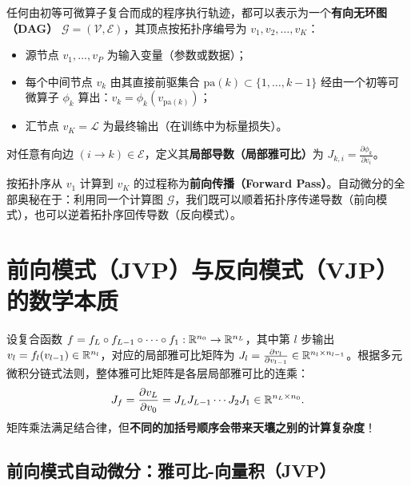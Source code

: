 \begin{defBox}
\begin{definition}
任何由初等可微算子复合而成的程序执行轨迹，都可以表示为一个\textbf{有向无环图（DAG）} $\mathcal{G} = (\mathcal{V}, \mathcal{E})$，其顶点按拓扑序编号为 $v_1, v_2, \dots, v_K$：
\begin{itemize}
  \item 源节点 $v_1, \dots, v_P$ 为输入变量（参数或数据）；
  \item 每个中间节点 $v_k$ 由其直接前驱集合 $\mathrm{pa}(k) \subset \{1, \dots, k-1\}$ 经由一个初等可微算子 $\phi_k$ 算出：$v_k = \phi_k(v_{\mathrm{pa}(k)})$；
  \item 汇节点 $v_K = \mathcal{L}$ 为最终输出（在训练中为标量损失）。
\end{itemize}
对任意有向边 $(i \to k) \in \mathcal{E}$，定义其\textbf{局部导数（局部雅可比）}为 $J_{k,i} = \frac{\partial \phi_k}{\partial v_i}$。
\end{definition}
\end{defBox}

按拓扑序从 $v_1$ 计算到 $v_K$ 的过程称为\textbf{前向传播（Forward Pass）}。自动微分的全部奥秘在于：利用同一个计算图 $\mathcal{G}$，我们既可以顺着拓扑序传递导数（前向模式），也可以逆着拓扑序回传导数（反向模式）。

\section{前向模式（JVP）与反向模式（VJP）的数学本质}
\label{sec:jvp-vjp}

设复合函数 $f = f_L \circ f_{L-1} \circ \cdots \circ f_1 : \mathbb{R}^{n_0} \to \mathbb{R}^{n_L}$，其中第 $l$ 步输出 $v_l = f_l(v_{l-1}) \in \mathbb{R}^{n_l}$，对应的局部雅可比矩阵为 $J_l = \frac{\partial v_l}{\partial v_{l-1}} \in \mathbb{R}^{n_l \times n_{l-1}}$。根据多元微积分链式法则，整体雅可比矩阵是各层局部雅可比的连乘：
\begin{equation}
  J_f = \frac{\partial v_L}{\partial v_0} = J_L J_{L-1} \cdots J_2 J_1 \in \mathbb{R}^{n_L \times n_0}.
  \label{eq:chain-matrix}
\end{equation}
矩阵乘法满足结合律，但\textbf{不同的加括号顺序会带来天壤之别的计算复杂度}！

\subsection{前向模式自动微分：雅可比-向量积（JVP）}


